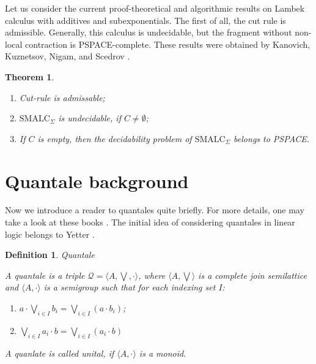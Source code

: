 \documentclass[a4paper]{article}
\theoremstyle{defin}
\newtheorem{defin}{Definition}
\theoremstyle{theorem}
\newtheorem{theorem}{Theorem}
\theoremstyle{prop}
\theoremstyle{lemma}
\theoremstyle{ex}
\theoremstyle{col}
\begin{document}
  \vspace{\baselineskip}

Let us consider the current proof-theoretical and algorithmic results on Lambek calculus with additives and subexponentials.
The first of all, the cut rule is admissible. Generally, this calculus is undecidable, but the fragment without non-local
contraction is PSPACE-complete. These results were obtained by Kanovich, Kuznetsov, Nigam, and Scedrov \cite{Sc}.

\begin{theorem}
$ $

  \begin{enumerate}
    \item Cut-rule is admissable;
    \item $\text{SMALC}_{\Sigma}$ is undecidable, if $C \neq \emptyset$;
    \item If $C$ is empty, then the decidability problem of $\text{SMALC}_{\Sigma}$ belongs to PSPACE.
  \end{enumerate}
\end{theorem}

\section{Quantale background}

Now we introduce a reader to quantales quite briefly. For more details, one may take a look at these books \cite{Quantale18}
\cite{Rosenthal}. The initial idea of considering quantales in linear logic belongs to Yetter \cite{Yetter}.

\begin{defin} Quantale
$ $

  A quantale is a triple $\mathcal{Q} = \langle A, \bigvee, \cdot \rangle$, where $\langle A, \bigvee \rangle$
is a complete join semilattice and $\langle A, \cdot \rangle$ is a semigroup such that for each indexing set $I$:

\begin{enumerate}
  \item $a \cdot \bigvee \limits_{i \in I} b_i = \bigvee \limits_{i \in I} (a \cdot b_i)$;
  \item $\bigvee \limits_{i \in I} a_i \cdot b = \bigvee \limits_{i \in I} (a_i \cdot b)$
\end{enumerate}

A quanlate is called unital, if $\langle A, \cdot \rangle$ is a monoid.
\end{defin}
\end{document}
